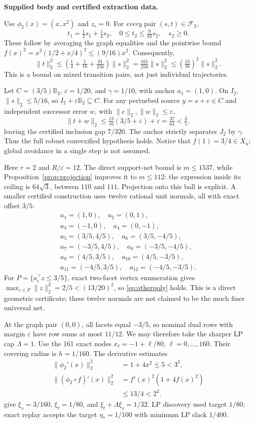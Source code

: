 \documentclass[journal,10pt]{IEEEtran}
\theoremstyle{definition}\newtheorem{definition}{Definition}
\theoremstyle{remark}
\begin{document}
\textbf{Supplied body and certified extraction data.}

Use $\phi_2(x)=(x,x^2)$ and $z_c=0$. For \emph{every} pair $(s,t)\in\mathcal F_2$,
\[
 t_1=\tfrac12s_1+\tfrac14s_2,\quad
 0\leq t_2\leq\tfrac9{16}s_2,\quad s_2\geq0.
\]
These follow by averaging the graph equalities and the pointwise bound
$f(x)^2=x^2(1/2+x/4)^2\leq(9/16)x^2$.
Consequently,
\[
 \|t\|_2^2\leq
 \left(\tfrac14+\tfrac1{16}+\tfrac{81}{256}\right)\|s\|_2^2
 =\tfrac{161}{256}\|s\|_2^2
 \leq(\tfrac{13}{16})^2\|s\|_2^2.
\]
This is a bound on mixed transition pairs, not just individual trajectories.

Let $C=(3/5)\mathbb B_2$, $\varepsilon=1/20$, and $\gamma=1/10$, with anchor $a_1=(1,0)$. On $I_2$,
$\|s\|_2\leq5/16$, so $I_2+\varepsilon\mathbb B_2\subseteq C$.
For any perturbed source $y=s+e\in C$ and independent successor error $w$, with $\|e\|_2,\|w\|_2\leq\varepsilon$,
\[
 \|t+w\|_2\leq\tfrac{13}{16}(3/5+\varepsilon)+\varepsilon
 =\tfrac{37}{64}<\tfrac35,
\]
leaving the certified inclusion gap $7/320$. The anchor strictly separates $J_2$ by $\gamma$. Thus the full robust convexified hypothesis holds. Notice that $f(1)=3/4\in X_u$; global avoidance in a single step is not assumed.

Here $r=2$ and $R/\varepsilon=12$. The direct support-net bound is $m\leq1537$, while Proposition~\ref{prop:projection} improves it to $m\leq112$: the expression inside its ceiling is $64\sqrt3$, between $110$ and $111$. Projection onto this ball is explicit. A smaller certified construction uses twelve rational unit normals, all with exact offset $3/5$:
\[
 \begin{gathered}
 a_1=(1,0),\quad a_2=(0,1),\\
 a_3=(-1,0),\quad a_4=(0,-1),\\
 a_5=(3/5,4/5),\quad a_6=(3/5,-4/5),\\
 a_7=(-3/5,4/5),\quad a_8=(-3/5,-4/5),\\
 a_9=(4/5,3/5),\quad a_{10}=(4/5,-3/5),\\
 a_{11}=(-4/5,3/5),\quad a_{12}=(-4/5,-3/5).
 \end{gathered}
\]
For $P=\{a_i^\top z\leq3/5\}$, exact two-facet vertex enumeration gives
$\max_{z\in P}\|z\|_2^2=2/5<(13/20)^2$, so \eqref{eq:otherpoly} holds. This is a direct geometric certificate; these twelve normals are not claimed to be the much finer universal net.

At the graph pair $(0,0)$, all facets equal $-3/5$, so nominal dual rows with margin $\varepsilon$ have row sums at most $11/12$. We may therefore take the sharper LP cap $\Lambda=1$.
Use the 161 exact nodes $x_\ell=-1+\ell/80$, $\ell=0,\ldots,160$.
Their covering radius is $h=1/160$. The derivative estimates
\[
\begin{aligned}
 \|\phi_2'(x)\|_2^2&=1+4x^2\leq5<3^2,\\
 \|(\phi_2\circ f)'(x)\|_2^2
 &=f'(x)^2(1+4f(x)^2)\\
 &\leq13/4<2^2.
\end{aligned}
\]
give $\xi_s=3/160$, $\xi_t=1/80$, and
$\xi_t+\Lambda\xi_s=1/32$.
LP discovery used target $1/80$; exact replay accepts the target
$\eta_*=1/100$ with minimum LP slack $1/400$.
\end{document}
